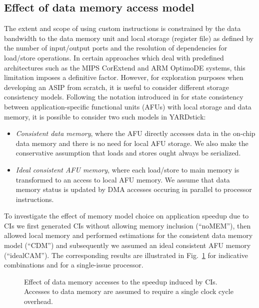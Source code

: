 \documentclass{comjnl}
\begin{document}
\subsection{Effect of data memory access model}
\label{Sec:MemoryAccessModel}
The extent and scope of using custom instructions is constrained by the data bandwidth to the data memory unit and local storage (register file) as defined by the number of input/output ports and the resolution of dependencies for load/store operations. In certain approaches \cite{ClarkN05,Leupers06} which deal with predefined architectures such as the MIPS CorExtend and ARM OptimoDE systems, this limitation imposes a definitive factor. However, for exploration purposes when developing an ASIP from scratch, it is useful to consider different storage consistency models. Following the notation introduced in \cite{Biswas07} for state consistency between application-specific functional units (AFUs) with local storage and data memory, it is possible to consider two such models in YARDstick:
\begin{itemize}
\item {{\it Consistent data memory}, where the AFU directly accesses data in the on-chip data memory and there is no need for local AFU storage. We also make the conservative assumption that loads and stores ought always be serialized.}
\item {{\it Ideal consistent AFU memory}, where each load/store to main memory is transformed to an access to local AFU memory. We assume that data memory status is updated by DMA accesses occuring in parallel to processor instructions.}
\end{itemize}   

To investigate the effect of memory model choice on application speedup due to CIs we first generated CIs without allowing memory inclusion (``noMEM''), then allowed local memory and performed estimations for the consistent data memory model (``CDM'') and subsequently we assumed an ideal consistent AFU memory (``idealCAM''). The corresponding results are illustrated in Fig.~\ref{Fig:9} for indicative  combinations and for a single-issue processor. 

\begin{figure}[tb]
  \centering
  \caption{Effect of data memory accesses to the speedup induced by CIs. Accesses to data memory are assumed to require a single clock cycle overhead.}
  \label{Fig:9}
  \vspace{-0.25cm}
\end{figure}
\end{document}
